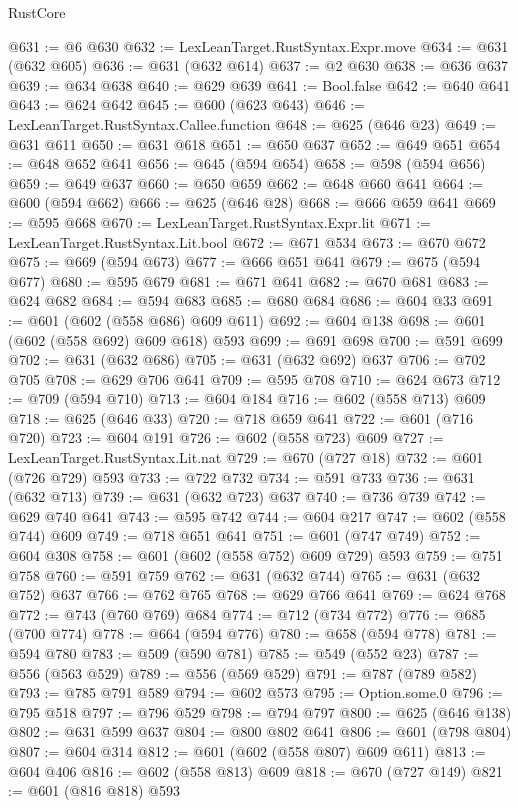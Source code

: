 \begin{lexlean}{RustCore}
\begin{coremodule}
@631 := @6 @630
@632 := LexLeanTarget.RustSyntax.Expr.move
@634 := @631 (@632 @605)
@636 := @631 (@632 @614)
@637 := @2 @630
@638 := @636 @637
@639 := @634 @638
@640 := @629 @639
@641 := Bool.false
@642 := @640 @641
@643 := @624 @642
@645 := @600 (@623 @643)
@646 := LexLeanTarget.RustSyntax.Callee.function
@648 := @625 (@646 @23)
@649 := @631 @611
@650 := @631 @618
@651 := @650 @637
@652 := @649 @651
@654 := @648 @652 @641
@656 := @645 (@594 @654)
@658 := @598 (@594 @656)
@659 := @649 @637
@660 := @650 @659
@662 := @648 @660 @641
@664 := @600 (@594 @662)
@666 := @625 (@646 @28)
@668 := @666 @659 @641
@669 := @595 @668
@670 := LexLeanTarget.RustSyntax.Expr.lit
@671 := LexLeanTarget.RustSyntax.Lit.bool
@672 := @671 @534
@673 := @670 @672
@675 := @669 (@594 @673)
@677 := @666 @651 @641
@679 := @675 (@594 @677)
@680 := @595 @679
@681 := @671 @641
@682 := @670 @681
@683 := @624 @682
@684 := @594 @683
@685 := @680 @684
@686 := @604 @33
@691 := @601 (@602 (@558 @686) @609 @611)
@692 := @604 @138
@698 := @601 (@602 (@558 @692) @609 @618) @593
@699 := @691 @698
@700 := @591 @699
@702 := @631 (@632 @686)
@705 := @631 (@632 @692) @637
@706 := @702 @705
@708 := @629 @706 @641
@709 := @595 @708
@710 := @624 @673
@712 := @709 (@594 @710)
@713 := @604 @184
@716 := @602 (@558 @713) @609
@718 := @625 (@646 @33)
@720 := @718 @659 @641
@722 := @601 (@716 @720)
@723 := @604 @191
@726 := @602 (@558 @723) @609
@727 := LexLeanTarget.RustSyntax.Lit.nat
@729 := @670 (@727 @18)
@732 := @601 (@726 @729) @593
@733 := @722 @732
@734 := @591 @733
@736 := @631 (@632 @713)
@739 := @631 (@632 @723) @637
@740 := @736 @739
@742 := @629 @740 @641
@743 := @595 @742
@744 := @604 @217
@747 := @602 (@558 @744) @609
@749 := @718 @651 @641
@751 := @601 (@747 @749)
@752 := @604 @308
@758 := @601 (@602 (@558 @752) @609 @729) @593
@759 := @751 @758
@760 := @591 @759
@762 := @631 (@632 @744)
@765 := @631 (@632 @752) @637
@766 := @762 @765
@768 := @629 @766 @641
@769 := @624 @768
@772 := @743 (@760 @769) @684
@774 := @712 (@734 @772)
@776 := @685 (@700 @774)
@778 := @664 (@594 @776)
@780 := @658 (@594 @778)
@781 := @594 @780
@783 := @509 (@590 @781)
@785 := @549 (@552 @23)
@787 := @556 (@563 @529)
@789 := @556 (@569 @529)
@791 := @787 (@789 @582)
@793 := @785 @791 @589
@794 := @602 @573
@795 := Option.some.{0}
@796 := @795 @518
@797 := @796 @529
@798 := @794 @797
@800 := @625 (@646 @138)
@802 := @631 @599 @637
@804 := @800 @802 @641
@806 := @601 (@798 @804)
@807 := @604 @314
@812 := @601 (@602 (@558 @807) @609 @611)
@813 := @604 @406
@816 := @602 (@558 @813) @609
@818 := @670 (@727 @149)
@821 := @601 (@816 @818) @593

\end{coremodule}
\end{lexlean}
